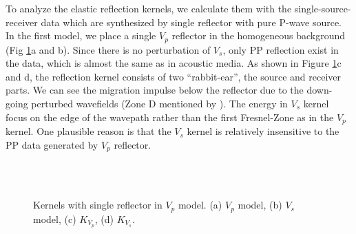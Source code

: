 To analyze the elastic reflection kernels, we calculate them with the single-source-receiver data
which are synthesized by single reflector with pure P-wave source.
In the first model, we place a single $V_p$ reflector in the homogeneous background (Fig \ref{fig:kernel1_vp}a and b). 
Since there is no perturbation of $V_s$, only PP reflection exist in the data, which is almost the same as in acoustic media.
As shown in Figure \ref{fig:kernel1_vp}c and d, the reflection kernel consists of two ``rabbit-ear'', the
source and receiver parts. 
We can see the migration impulse below the reflector due to the down-going perturbed wavefields
(Zone D mentioned by \cite{Zhou2015}).
The energy in $V_s$ kernel focus on the edge of the wavepath rather than the first Fresnel-Zone as in the $V_p$ kernel.
One plausible reason is that the $V_s$ kernel is relatively insensitive to the PP data generated by $V_p$ reflector.
\begin{figure}[h]
   \centering
   \\
   \\
   \caption{Kernels with single reflector in $V_p$ model. (a) $V_p$ model, (b) $V_s$ model, (c) $K_{V_p}$, (d) $K_{V_s}$.}
   \label{fig:kernel1_vp}
\end{figure}

